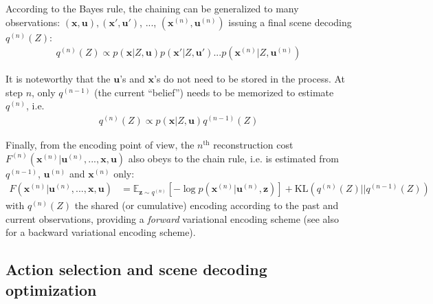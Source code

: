 \documentclass[12pt,twoside,openright]{article}
\begin{document}
According to the Bayes rule, the chaining can be generalized to many observations: $(\boldsymbol{x},\boldsymbol{u}), (\boldsymbol{x}',\boldsymbol{u}')$, ..., $(\boldsymbol{x}^{(n)},\boldsymbol{u}^{(n)})$ issuing a final scene decoding $q^{(n)}(Z)$:
\begin{align}
q^{(n)}(Z) \propto p(\boldsymbol{x}|Z,\boldsymbol{u}) p(\boldsymbol{x}'|Z,\boldsymbol{u}') ... p(\boldsymbol{x}^{(n)}|Z,\boldsymbol{u}^{(n)}) \label{eq:accum}
\end{align}
 
 
It is noteworthy that the $\boldsymbol{u}$'s and $\boldsymbol{x}$'s do not need to be stored in the process. At step $n$, only $q^{(n-1)}$ (the current ``belief'') needs to be memorized to estimate $q^{(n)}$, i.e. 
\begin{align} 
q^{(n)}(Z) \propto p(\boldsymbol{x}|Z,\boldsymbol{u}) q^{(n-1)}(Z) \label{eq:accum-post}
\end{align}

Finally, from the encoding point of view, the $n^\text{th}$ reconstruction cost $F^{(n)}(\boldsymbol{x}^{(n)}|\boldsymbol{u}^{(n)}, ..., \boldsymbol{x}, \boldsymbol{u})$ also obeys to the chain rule, i.e. is estimated from $q^{(n-1)}$, $\boldsymbol{u}^{(n)}$ and $\boldsymbol{x}^{(n)}$ only:
\begin{align}
F(\boldsymbol{x}^{(n)}|\boldsymbol{u}^{(n)}, ...,  \boldsymbol{x}, \boldsymbol{u}) 
&= \mathbb{E}_{\boldsymbol{z} \sim q^{(n)}} \left[-\log p(\boldsymbol{x}^{(n)}| \boldsymbol{u}^{(n)}, \boldsymbol{z})\right] + \text{KL}(q^{(n)}(Z)||q^{(n-1)}(Z))
\label{eq:FEP-uxun}
\end{align}
with $q^{(n)}(Z)$ the shared (or cumulative) encoding according to the past and current observations, providing a \emph{forward} variational encoding scheme (see also \cite{fraccaro2016sequential} for a backward variational encoding scheme). 


\subsection{Action selection and scene decoding optimization}
\end{document}
